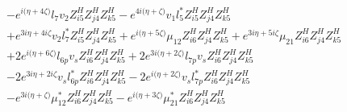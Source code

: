 \begin{align}
 &- e^{i \Big(\eta +4 \zeta \Big)} l_7 v_2 Z_{{i 5}}^{H} Z_{{j 4}}^{H} Z_{{k 5}}^{H} - e^{4 i \Big(\eta +\zeta \Big)} v_1 l_5^* Z_{{i 5}}^{H} Z_{{j 4}}^{H} Z_{{k 5}}^{H} \nonumber \\ 
 &+e^{3 i \eta +4 i \zeta } v_2 l_7^* Z_{{i 5}}^{H} Z_{{j 4}}^{H} Z_{{k 5}}^{H} +e^{i \Big(\eta +5 \zeta \Big)} \mu_{12} Z_{{i 6}}^{H} Z_{{j 4}}^{H} Z_{{k 5}}^{H} +e^{3 i \eta +5 i \zeta } \mu_{21} Z_{{i 6}}^{H} Z_{{j 4}}^{H} Z_{{k 5}}^{H} \nonumber \\ 
 &+2 e^{i \Big(\eta +6 \zeta \Big)} l_{6p} v_s Z_{{i 6}}^{H} Z_{{j 4}}^{H} Z_{{k 5}}^{H} +2 e^{3 i \Big(\eta +2 \zeta \Big)} l_{7p} v_s Z_{{i 6}}^{H} Z_{{j 4}}^{H} Z_{{k 5}}^{H} \nonumber \\ 
 &-2 e^{3 i \eta +2 i \zeta } v_s l_{6p}^* Z_{{i 6}}^{H} Z_{{j 4}}^{H} Z_{{k 5}}^{H} -2 e^{i \Big(\eta +2 \zeta \Big)} v_s l_{7p}^* Z_{{i 6}}^{H} Z_{{j 4}}^{H} Z_{{k 5}}^{H} \nonumber \\ 
 &- e^{3 i \Big(\eta +\zeta \Big)} \mu_{12}^* Z_{{i 6}}^{H} Z_{{j 4}}^{H} Z_{{k 5}}^{H} - e^{i \Big(\eta +3 \zeta \Big)} \mu_{21}^* Z_{{i 6}}^{H} Z_{{j 4}}^{H} Z_{{k 5}}^{H} \nonumber 
\end{align} 
